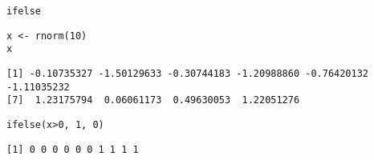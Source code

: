 \documentclass[xcolor={usenames,svgnames,dvipsnames}]{beamer}
\begin{document}
\begin{frame}[fragile,label={sec:org4dd1b0c}]{\texttt{ifelse}}
 \lstset{language=r,label= ,caption= ,captionpos=b,numbers=none}
\begin{lstlisting}
x <- rnorm(10)
x
\end{lstlisting}

\begin{verbatim}
[1] -0.10735327 -1.50129633 -0.30744183 -1.20988860 -0.76420132 -1.11035232
[7]  1.23175794  0.06061173  0.49630053  1.22051276
\end{verbatim}

\lstset{language=r,label= ,caption= ,captionpos=b,numbers=none}
\begin{lstlisting}
ifelse(x>0, 1, 0)
\end{lstlisting}

\begin{verbatim}
[1] 0 0 0 0 0 0 1 1 1 1
\end{verbatim}
\end{frame}
\end{document}
